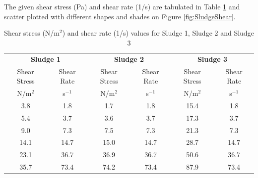 \documentclass[a4paper]{article}
\begin{document}
\section{}
The given shear stress (Pa) and shear rate (1/s) are tabulated in Table \ref{tab:rheology} and scatter plotted with different shapes and shades on Figure \ref{fig:SludgeShear}.
\begin{table}[ht]
    \caption{Shear stress (N/m$^2$) and shear rate (1/s) values for Sludge 1, Sludge 2 and Sludge 3}
    \centering
    \begin{tabular}{cccccc}
         \toprule
         \multicolumn{2}{c}{\textbf{Sludge 1}} & \multicolumn{2}{c}{\textbf{Sludge 2}} & \multicolumn{2}{c}{\textbf{Sludge 3}} \\
         \cmidrule(lr){1-2} \cmidrule(lr){3-4} \cmidrule(lr){5-6}
         Shear Stress & Shear Rate & Shear Stress & Shear Rate & Shear Stress & Shear Rate \\
         N/m$^2$ & s$^{-1}$ & N/m$^2$ & s$^{-1}$ & N/m$^2$ & s$^{-1}$ \\
         \cmidrule(lr){1-1} \cmidrule(lr){2-2} \cmidrule(lr){3-3} \cmidrule(lr){4-4} \cmidrule(lr){5-5} \cmidrule(lr){6-6}
         3.8	& 1.8	& 1.7	& 1.8	& 15.4	& 1.8 \\
         5.4	& 3.7	& 3.6	& 3.7	& 17.3	& 3.7 \\
         9.0	& 7.3	& 7.5	& 7.3	& 21.3	& 7.3 \\
         14.1 & 14.7	& 15.0	& 14.7 & 28.7 & 14.7 \\
         23.1 & 36.7 & 36.9 & 36.7 & 50.6 & 36.7 \\
         35.7 & 73.4 & 74.2 & 73.4 & 87.9 & 73.4 \\
         \bottomrule
    \end{tabular}
    \label{tab:rheology}
\end{table}
\end{document}
